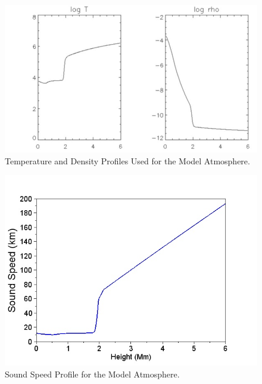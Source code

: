 \documentclass{aa}
\begin{document}



\begin{figure}[h]
\includegraphics[scale=0.7]{images/VAL3C_fig2.jpg}
\caption{Temperature and Density Profiles Used for the Model Atmosphere. }
\end{figure}


\begin{figure}[h]
\includegraphics[scale=0.7]{images/soundspeedVAL3C_profile_fig3.jpeg}
\caption{Sound Speed Profile for the Model Atmosphere. }
\end{figure}
\end{document}
